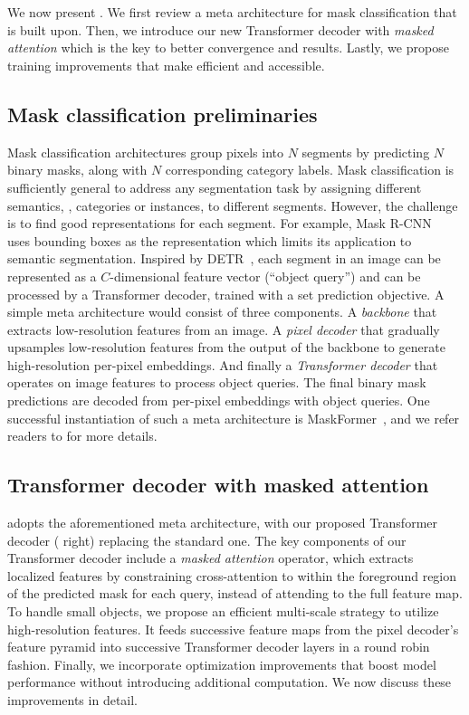 \section{\modelnamelong}
We now present \modelname.
We first review a  meta architecture for mask classification that \modelname is built upon.
Then, we introduce our new Transformer decoder with \emph{masked attention} which is the key to better convergence and results.
Lastly, we propose training improvements that make \modelname  efficient and accessible.


\subsection{Mask classification preliminaries}
Mask classification architectures group pixels into $N$ segments by predicting $N$ binary masks, along with $N$ corresponding category labels. Mask classification is sufficiently general to address any segmentation task by assigning different semantics, \eg, categories or instances, to different segments. However, the challenge is to find good representations for each segment. For example, Mask R-CNN~\cite{he2017mask} uses bounding boxes as the representation which limits its application to semantic segmentation.
Inspired by DETR~\cite{detr}, each segment in an image can be represented as a $C$-dimensional feature vector (``object query'') and can be processed by a Transformer decoder, trained with a set prediction objective.
A simple meta architecture would consist of three components.
A \emph{backbone} that extracts low-resolution features from an image. A \emph{pixel decoder} that gradually upsamples low-resolution features from the output of the backbone to generate high-resolution per-pixel embeddings. And finally a \emph{Transformer decoder} that operates on image features to process object queries. The final binary mask predictions are decoded from per-pixel embeddings with object queries. One successful instantiation of such a meta architecture is MaskFormer~\cite{cheng2021maskformer}, and we refer readers to \cite{cheng2021maskformer} for more details.


\subsection{Transformer decoder with masked attention}
\label{sec:method:arch:transformer_decoder}

\modelname adopts the aforementioned meta architecture, with our proposed Transformer decoder ( right) replacing the standard one. %
The key components of our Transformer decoder include a \emph{masked attention} operator, which extracts  localized features by constraining cross-attention to within the foreground region of the predicted mask for each query, instead of
attending to the full feature map.
To handle small objects, we propose an efficient multi-scale strategy to utilize high-resolution features.
It feeds successive feature maps from the pixel decoder's feature pyramid %
into successive Transformer decoder layers in a round robin fashion.
Finally, we incorporate optimization improvements that boost model performance without introducing additional computation.
We now discuss these improvements in detail.

